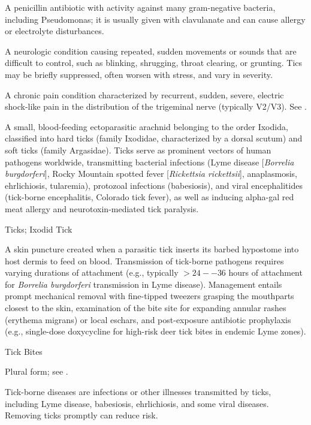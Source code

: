  A penicillin antibiotic with activity against many gram-negative bacteria, including Pseudomonas; it is usually given with clavulanate and can cause allergy or electrolyte disturbances.

 A neurologic condition causing repeated, sudden movements or sounds that are difficult to control, such as blinking, shrugging, throat clearing, or grunting. Tics may be briefly suppressed, often worsen with stress, and vary in severity.

 A chronic pain condition characterized by recurrent, sudden, severe, electric shock-like
pain in the distribution of the trigeminal nerve (typically V2/V3). See .

 A small, blood-feeding ectoparasitic arachnid belonging to the order Ixodida, classified into hard ticks (family Ixodidae, characterized by a dorsal scutum) and soft ticks (family Argasidae). Ticks serve as prominent vectors of human pathogens worldwide, transmitting bacterial infections (Lyme disease [\textit{Borrelia burgdorferi}], Rocky Mountain spotted fever [\textit{Rickettsia rickettsii}], anaplasmosis, ehrlichiosis, tularemia), protozoal infections (babesiosis), and viral encephalitides (tick-borne encephalitis, Colorado tick fever), as well as inducing alpha-gal red meat allergy and neurotoxin-mediated tick paralysis.

\synonyms
Ticks; Ixodid Tick

 A skin puncture created when a parasitic tick inserts its barbed hypostome into host dermis to feed on blood. Transmission of tick-borne pathogens requires varying durations of attachment (e.g., typically $>24--36$ hours of attachment for \textit{Borrelia burgdorferi} transmission in Lyme disease). Management entails prompt mechanical removal with fine-tipped tweezers grasping the mouthparts closest to the skin, examination of the bite site for expanding annular rashes (erythema migrans) or local eschars, and post-exposure antibiotic prophylaxis (e.g., single-dose doxycycline for high-risk deer tick bites in endemic Lyme zones).

\synonyms
Tick Bites

 Plural form; see .

 Tick-borne diseases are infections or other illnesses transmitted by ticks, including Lyme disease, babesiosis, ehrlichiosis, and some viral diseases. Removing ticks promptly can reduce risk.

